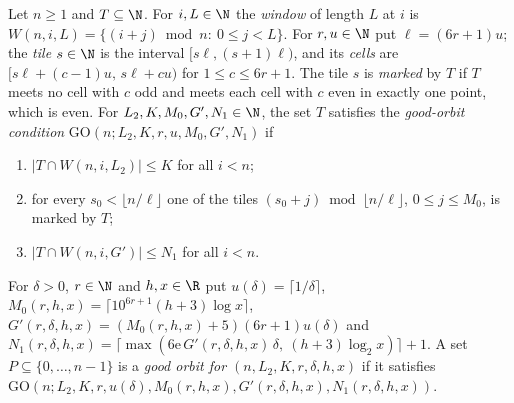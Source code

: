 \begin{definition}\label{pf:top-supply:goodorbit}
Let $n\ge1$ and $T\subseteq\N$. For $i,L\in\N$ the \emph{window} of length $L$ at $i$ is
$W(n,i,L)=\{(i+j)\bmod n:\ 0\le j<L\}$. For $r,u\in\N$ put $\ell=(6r+1)u$; the \emph{tile} $s\in\N$ is the interval
$[s\ell,(s+1)\ell)$, and its \emph{cells} are $[s\ell+(c-1)u,\,s\ell+cu)$ for $1\le c\le6r+1$. The tile $s$ is \emph{marked}
by $T$ if $T$ meets no cell with $c$ odd and meets each cell with $c$ even in exactly one point, which is even. For
$L_2,K,M_0,G',N_1\in\N$, the set $T$ satisfies the \emph{good-orbit condition} $\mathrm{GO}(n;L_2,K,r,u,M_0,G',N_1)$ if
\begin{enumerate}[label=(\Alph*),leftmargin=*]
\item $|T\cap W(n,i,L_2)|\le K$ for all $i<n$;
\item for every $s_0<\lfloor n/\ell\rfloor$ one of the tiles $(s_0+j)\bmod\lfloor n/\ell\rfloor$, $0\le j\le M_0$, is marked
by $T$;
\item $|T\cap W(n,i,G')|\le N_1$ for all $i<n$.
\end{enumerate}
For $\delta>0$, $r\in\N$ and $h,x\in\R$ put $u(\delta)=\lceil1/\delta\rceil$,
$M_0(r,h,x)=\lceil10^{6r+1}(h+3)\log x\rceil$, $G'(r,\delta,h,x)=(M_0(r,h,x)+5)(6r+1)u(\delta)$ and
$N_1(r,\delta,h,x)=\lceil\max(6\mathrm e\,G'(r,\delta,h,x)\,\delta,\ (h+3)\log_2x)\rceil+1$. A set
$P\subseteq\{0,\dots,n-1\}$ is a \emph{good orbit for $(n,L_2,K,r,\delta,h,x)$} if it satisfies
$\mathrm{GO}(n;L_2,K,r,u(\delta),M_0(r,h,x),G'(r,\delta,h,x),N_1(r,\delta,h,x))$.
 
   
  
 
 
\end{definition}

